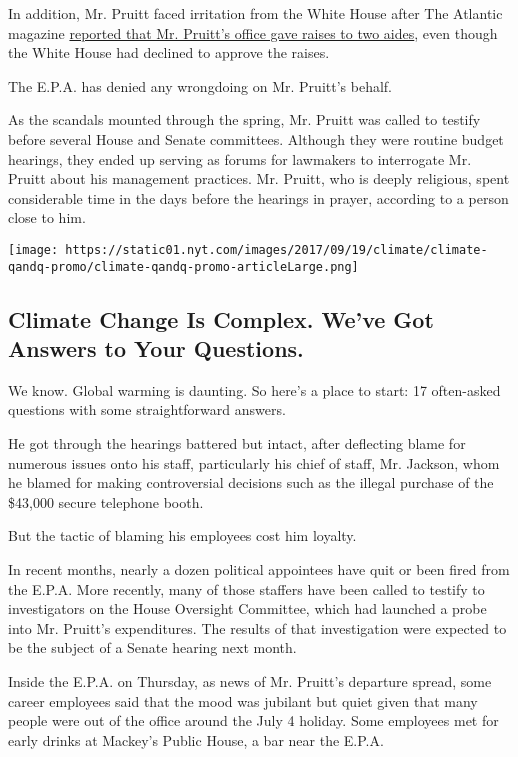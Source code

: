 In addition, Mr. Pruitt faced irritation from the White House after The
Atlantic magazine
\href{https://www.theatlantic.com/politics/archive/2018/04/pruitt-epa/557123/}{reported
that Mr. Pruitt's office gave raises to two aides}, even though the
White House had declined to approve the raises.

The E.P.A. has denied any wrongdoing on Mr. Pruitt's behalf.

As the scandals mounted through the spring, Mr. Pruitt was called to
testify before several House and Senate committees. Although they were
routine budget hearings, they ended up serving as forums for lawmakers
to interrogate Mr. Pruitt about his management practices. Mr. Pruitt,
who is deeply religious, spent considerable time in the days before the
hearings in prayer, according to a person close to him.

\href{https://www.nytimes.com/interactive/2017/climate/what-is-climate-change.html}{}

\texttt{[image: https://static01.nyt.com/images/2017/09/19/climate/climate-qandq-promo/climate-qandq-promo-articleLarge.png]}

\hypertarget{climate-change-is-complex-weve-got-answers-to-your-questions}{%
\subsection{Climate Change Is Complex. We've Got Answers to Your
Questions.}\label{climate-change-is-complex-weve-got-answers-to-your-questions}}

We know. Global warming is daunting. So here's a place to start: 17
often-asked questions with some straightforward answers.

He got through the hearings battered but intact, after deflecting blame
for numerous issues onto his staff, particularly his chief of staff, Mr.
Jackson, whom he blamed for making controversial decisions such as the
illegal purchase of the \$43,000 secure telephone booth.

But the tactic of blaming his employees cost him loyalty.

In recent months, nearly a dozen political appointees have quit or been
fired from the E.P.A. More recently, many of those staffers have been
called to testify to investigators on the House Oversight Committee,
which had launched a probe into Mr. Pruitt's expenditures. The results
of that investigation were expected to be the subject of a Senate
hearing next month.

Inside the E.P.A. on Thursday, as news of Mr. Pruitt's departure spread,
some career employees said that the mood was jubilant but quiet given
that many people were out of the office around the July 4 holiday. Some
employees met for early drinks at Mackey's Public House, a bar near the
E.P.A.

